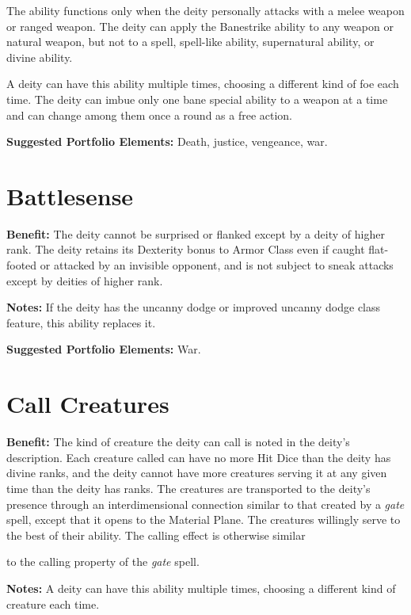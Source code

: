 \documentclass{article}
\begin{document}
The ability functions only when the deity personally attacks with a melee weapon 
or ranged weapon. The deity can apply the Banestrike ability to any weapon or natural 
weapon, but not to a spell, spell-like ability, supernatural ability, or divine 
ability.

A deity can have this ability multiple times, choosing a different kind of foe 
each time. The deity can imbue only one bane special ability to a weapon at a time 
and can change among them once a round as a free action.

\textbf{Suggested Portfolio Elements:} Death, justice, vengeance, war.

\vspace{12pt}
\section*{Battlesense}

\textbf{Benefit:} The deity cannot be surprised or flanked except by a deity of 
higher rank. The deity retains its Dexterity bonus to Armor Class even if caught 
flat-footed or attacked by an invisible opponent, and is not subject to sneak attacks 
except by deities of higher rank.

\textbf{Notes:} If the deity has the uncanny dodge or improved uncanny dodge class 
feature, this ability replaces it.

\textbf{Suggested Portfolio Elements:} War.

\vspace{12pt}
\section*{Call Creatures}

\textbf{Benefit:} The kind of creature the deity can call is noted in the deity's 
description. Each creature called can have no more Hit Dice than the deity has 
divine ranks, and the deity cannot have more creatures serving it at any given 
time than the deity has ranks. The creatures are transported to the deity's presence 
through an interdimensional connection similar to that created by a \textit{gate 
}spell, except that it opens to the Material Plane. The creatures willingly serve 
to the best of their ability. The calling effect is otherwise similar

to the calling property of the \textit{gate }spell.

\textbf{Notes:} A deity can have this ability multiple times, choosing a different 
kind of creature each time.
\end{document}
